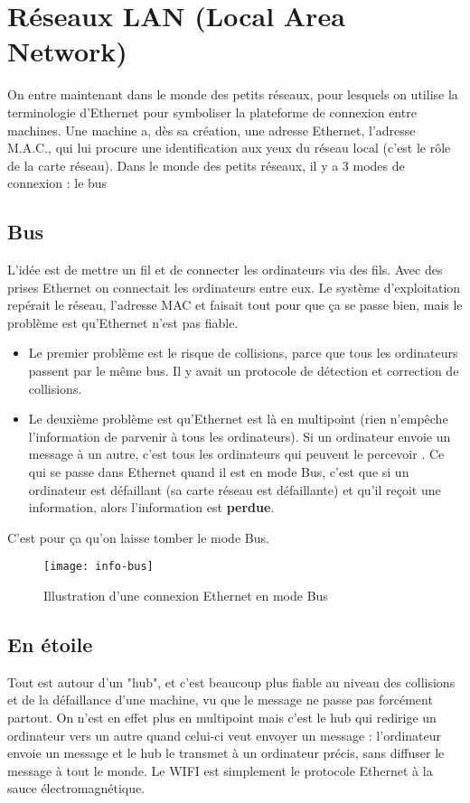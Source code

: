 \documentclass[12pt,a4paper]{report}
\begin{document}
\section{Réseaux LAN (Local Area Network)}
On entre maintenant dans le monde des petits réseaux, pour lesquels on utilise la terminologie d'Ethernet pour symboliser la plateforme de connexion entre machines. Une machine a, dès sa création, une adresse Ethernet, l'adresse M.A.C., qui lui procure une identification aux yeux du réseau local (c'est le rôle de la carte réseau). Dans le monde des petits réseaux, il y a 3 modes de connexion : le bus

\subsection{Bus}
L'idée est de mettre un fil et de connecter les ordinateurs via des fils. Avec des prises Ethernet on connectait les ordinateurs entre eux. Le système d'exploitation repérait le réseau, l'adresse MAC et faisait tout pour que ça se passe bien, mais le problème est qu'Ethernet n'est pas fiable. 
\begin{itemize}
\item Le premier problème est le risque de collisions, parce que tous les ordinateurs passent par le même bus. Il y avait un protocole de détection et correction de collisions.
\item Le deuxième problème est qu'Ethernet est là en multipoint (rien n'empêche l'information de parvenir à tous les ordinateurs). Si un ordinateur envoie un message à un autre, c'est tous les ordinateurs qui peuvent le percevoir . Ce qui se passe dans Ethernet quand il est en mode Bus, c'est que si un ordinateur est défaillant (sa carte réseau est défaillante) et qu'il reçoit une information, alors l'information est \textbf{perdue}.
\end{itemize}
C'est pour ça qu'on laisse tomber le mode Bus.
\begin{figure}[h!]
\centering
\texttt{[image: info-bus]}
\caption{Illustration d'une connexion Ethernet en mode Bus}
\label{fig:bus}
\end{figure}
\subsection{En étoile}
Tout est autour d'un "hub", et c'est beaucoup plus fiable au niveau des collisions et de la défaillance d'une machine, vu que le message ne passe pas forcément partout. On n'est en effet plus en multipoint mais c'est le hub qui redirige un ordinateur vers un autre quand celui-ci veut envoyer un message : l'ordinateur envoie un message et le hub le transmet à un ordinateur précis, sans diffuser le message à tout le monde. Le WIFI est simplement le protocole Ethernet à la sauce électromagnétique.
\end{document}
